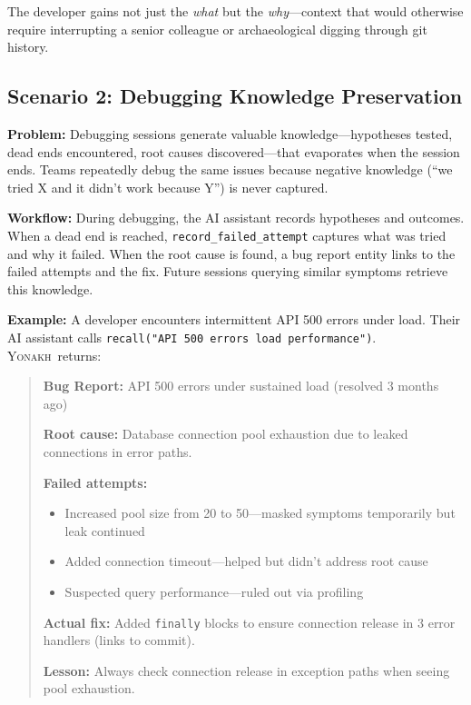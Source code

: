 \documentclass[10pt,journal,compsoc]{IEEEtran}
\newcommand{\yonakh}{\textsc{Yonakh}}
\begin{document}
The developer gains not just the \emph{what} but the \emph{why}---context that would otherwise require interrupting a senior colleague or archaeological digging through git history.

\subsection{Scenario 2: Debugging Knowledge Preservation}

\textbf{Problem:} Debugging sessions generate valuable knowledge---hypotheses tested, dead ends encountered, root causes discovered---that evaporates when the session ends. Teams repeatedly debug the same issues because negative knowledge (``we tried X and it didn't work because Y'') is never captured.

\textbf{Workflow:} During debugging, the AI assistant records hypotheses and outcomes. When a dead end is reached, \texttt{record\_failed\_attempt} captures what was tried and why it failed. When the root cause is found, a bug report entity links to the failed attempts and the fix. Future sessions querying similar symptoms retrieve this knowledge.

\textbf{Example:} A developer encounters intermittent API 500 errors under load. Their AI assistant calls \texttt{recall("API 500 errors load performance")}. \yonakh\ returns:

\begin{quote}
\textbf{Bug Report:} API 500 errors under sustained load (resolved 3 months ago)

\textbf{Root cause:} Database connection pool exhaustion due to leaked connections in error paths.

\textbf{Failed attempts:}
\begin{itemize}
\item Increased pool size from 20 to 50---masked symptoms temporarily but leak continued
\item Added connection timeout---helped but didn't address root cause
\item Suspected query performance---ruled out via profiling
\end{itemize}

\textbf{Actual fix:} Added \texttt{finally} blocks to ensure connection release in 3 error handlers (links to commit).

\textbf{Lesson:} Always check connection release in exception paths when seeing pool exhaustion.
\end{quote}
\end{document}
